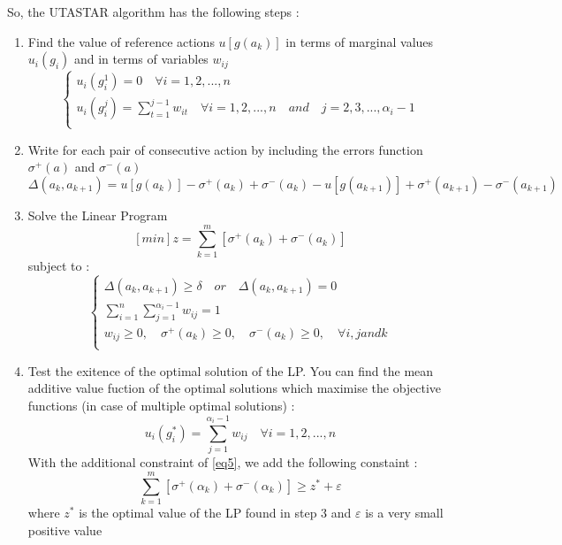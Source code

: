 \documentclass{report}
\begin{document}
So, the UTASTAR algorithm has the following steps :\\ 
\begin{enumerate}
\item Find the value of reference actions $u[g(a_k)]$ in terms of marginal values  $u_i(g_i)$ and in terms of variables  $w_{ij}$
\begin{equation}
  \left\{
      \begin{aligned}
     	u_i(g_i^1) = 0 \quad \forall i = 1,2,...,n \\
	u_i(g_i^j) =	  \sum_{t=1}^{j-1} w_{it} \quad \forall i = 1,2,...,n \quad and \quad j = 2,3,...,\alpha _i -1 \\
      \end{aligned}
    \right.
\end{equation}
\item Write for each pair of consecutive action by including the errors function $\sigma ^{+} (a)$ and $\sigma ^{-} (a)$
\begin{equation}
	\Delta (a_k , a_{k+1}) = u[g(a_k)] - \sigma ^{+} (a_k) + \sigma ^{-} (a_k) -  u[g(a_{k+1})] + \sigma ^{+} (a_{k+1}) - \sigma ^{-} (a_{k+1})
\end{equation}
\item Solve the Linear Program
$$ [min]z = \sum_{k=1}^{m} [ \sigma ^{+} (a_k) + \sigma ^{-} (a_k)]  $$
subject to : \\
\begin{equation}
  \left\{
      \begin{aligned}\label{eq5}
      	\Delta (a_k, a_{k+1} ) \geq \delta \quad or \quad \Delta (a_k, a_{k+1} ) = 0 \\
      	\sum_{i=1}^{n} \sum_{j=1}^{\alpha_i -1} w_{ij} = 1\\
       	w_{ij} \geq 0, \quad \sigma^{+}(a_k) \geq 0, \quad \sigma^{-}(a_k) \geq 0, \quad  \forall i, j  and  k\\
      \end{aligned}
    \right.
\end{equation}
\item Test the exitence of the optimal solution of the LP. You can find the mean additive value fuction of the optimal solutions which maximise the objective functions (in case of multiple optimal solutions) : 
\begin{equation}
	u_i(g_i^{*}) = \sum_{j=1}^{\alpha_i - 1} w_{ij} \quad \forall i = 1,2,...,n
\end{equation}
With the additional constraint of \eqref{eq5}, we add the following constaint : 
\begin{equation}
	\sum_{k=1}^{m} [ \sigma^{+} (\alpha _k) + \sigma ^{-}(\alpha _k)]  \geq z^{*} + \varepsilon 
\end{equation}
where $z^{*}$ is the optimal value of the LP found in step 3 and $\varepsilon$ is a very small positive value
\end{enumerate}
\end{document}
